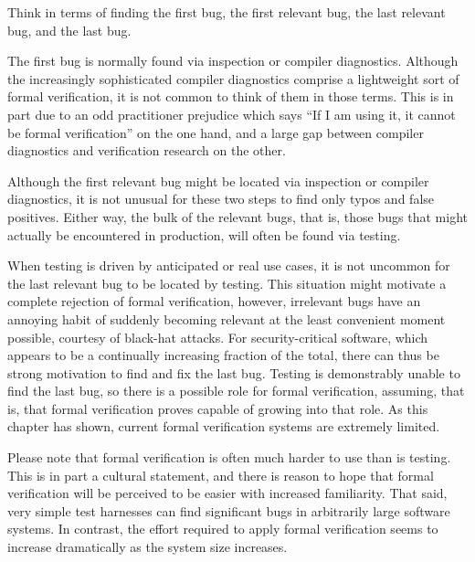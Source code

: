 Think in terms of finding the first bug, the first relevant bug, the
last relevant bug, and the last bug.

The first bug is normally found via inspection or compiler diagnostics.
Although the increasingly sophisticated compiler diagnostics comprise
a lightweight sort of formal verification, it is not common to think of
them in those terms.
This is in part due to an odd practitioner prejudice which says ``If I am
using it, it cannot be formal verification'' on the one hand, and a large
gap between compiler diagnostics and verification research on the other.

Although the first relevant bug might be located via inspection or
compiler diagnostics, it is not unusual for these two steps to find
only typos and false positives.
Either way, the bulk of the relevant bugs, that is, those bugs that
might actually be encountered in production, will often be found via testing.

When testing is driven by anticipated or real use cases, it is not
uncommon for the last relevant bug to be located by testing.
This situation might motivate a complete rejection of formal verification,
however, irrelevant bugs have an annoying habit of suddenly becoming relevant
at the least convenient moment possible, courtesy of black-hat attacks.
For security-critical software, which appears to be a continually
increasing fraction of the total, there can thus be strong motivation
to find and fix the last bug.
Testing is demonstrably unable to find the last bug, so there is a
possible role for formal verification, assuming, that is, that
formal verification proves capable of growing into that role.
As this chapter has shown, current formal verification systems are
extremely limited.

\QuickQuizEnd

Please note that formal verification is often much harder to use than
is testing.
This is in part a cultural statement, and there is reason to hope
that formal verification will be perceived to be easier with increased
familiarity.
That said, very simple test harnesses can find significant bugs in arbitrarily
large software systems.
In contrast, the effort required to apply formal verification seems to
increase dramatically as the system size increases.

